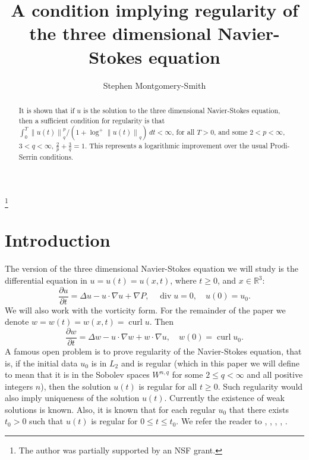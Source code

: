 \documentclass[12pt]{amsart}
\theoremstyle{remark}
\newcommand{\R}{{\mathbb R}}
\newcommand{\snormo}[1]{{\mathopen\|#1\mathclose\|}}
\DeclareMathOperator{\curl}{curl}
\DeclareMathOperator{\divergence}{div}
\begin{document}
\title[Regularity of Navier-Stokes]
{A condition implying regularity of the three dimensional Navier-Stokes
equation}
\author{Stephen Montgomery-Smith}
\makeatletter
\address{Department of Mathematics,
University of Missouri,
Columbia, MO 65211}
\thanks{The author was
partially supported
by an NSF grant.}

\begin{abstract}
It is shown that if $u$ is the solution to the
three dimensional Navier-Stokes equation, then a sufficient condition
for regularity is that 
$\int_0^T {\snormo{u(t)}_q^p}/{(1+\log^+ \snormo{u(t)}_q)}
 \, dt < \infty $,
for all $T>0$, and some
$2 < p < \infty$, $3 < q < \infty$,
$\frac2p+\frac3q=1$.  This represents a logarithmic
improvement over the usual Prodi-Serrin conditions.
\end{abstract}

\maketitle

\section{Introduction}

The version of the three dimensional
Navier-Stokes equation we will study is the
differential equation in
$u = u(t) = u(x,t)$, where $ t\ge 0$, and $x \in \R^3$:
$$ \frac{\partial u}{\partial t}
   = \Delta u - u \cdot \nabla u + \nabla P ,
   \quad \divergence u = 0 ,
   \quad u(0) = u_0.$$
We will also work with the vorticity form.  For the remainder of the paper
we denote $w = w(t) = w(x,t) = \curl u$.
Then
$$ \frac{\partial w}{\partial t}
   = \Delta w - u \cdot \nabla w + w \cdot \nabla u ,
   \quad w(0) = \curl u_0 .$$
A famous open problem is to prove regularity of the Navier-Stokes
equation, that is, if the initial data $u_0$ is in $L_2$ and is
regular (which in this paper we will define to mean that it is
in the Sobolev spaces $W^{n,q}$ for some $2\le q<\infty$ and all positive
integers $n$), then the solution $u(t)$ is regular for all
$t\ge0$.  Such regularity would also imply uniqueness of the solution
$u(t)$.  Currently the existence of weak solutions is known.
Also, it is known that for each regular $u_0$ that there exists
$t_0>0$ such that $u(t)$ is regular for $0\le t \le t_0$.
We refer the reader to 
\cite{cannone}, \cite{constantin-foias}, \cite{doering-gibbons},
\cite{lemarie-rieusset}, \cite{temam}.
\end{document}
